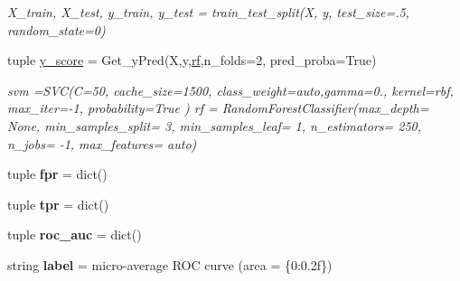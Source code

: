 \begin{DoxyCompactItemize}
\begin{DoxyCompactList}\small\item\em X\+\_\+train, X\+\_\+test, y\+\_\+train, y\+\_\+test = train\+\_\+test\+\_\+split(X, y, test\+\_\+size=.5, random\+\_\+state=0) \end{DoxyCompactList}\item 
tuple \hyperlink{namespacefeat__extract_1_1_sci_kit__plot__roc_a98d01a02754219127aef4d005b5a6792}{y\+\_\+score} = Get\+\_\+y\+Pred(X,y,\hyperlink{namespacefeat__extract_1_1_sci_kit__plot__roc_a8b0b42ffc18823f8984e05932472af40}{rf},n\+\_\+folds=2, pred\+\_\+proba=True)
\begin{DoxyCompactList}\small\item\em svm =S\+V\+C(C=50, cache\+\_\+size=1500, class\+\_\+weight=\textquotesingle{}auto\textquotesingle{},gamma=0., kernel=\textquotesingle{}rbf\textquotesingle{}, max\+\_\+iter=-\/1, probability=True ) rf = Random\+Forest\+Classifier(max\+\_\+depth= None, min\+\_\+samples\+\_\+split= 3, min\+\_\+samples\+\_\+leaf= 1, n\+\_\+estimators= 250, n\+\_\+jobs= -\/1, max\+\_\+features= auto) \end{DoxyCompactList}\item 
\hypertarget{namespacefeat__extract_1_1_sci_kit__plot__roc_aca9bca14b02cc6ce37b7aa2e69c9524f}{}tuple {\bfseries fpr} = dict()\label{namespacefeat__extract_1_1_sci_kit__plot__roc_aca9bca14b02cc6ce37b7aa2e69c9524f}

\item 
\hypertarget{namespacefeat__extract_1_1_sci_kit__plot__roc_a27af3aa05cd8c25711ddbe940ece1850}{}tuple {\bfseries tpr} = dict()\label{namespacefeat__extract_1_1_sci_kit__plot__roc_a27af3aa05cd8c25711ddbe940ece1850}

\item 
\hypertarget{namespacefeat__extract_1_1_sci_kit__plot__roc_a4b6479bcfc1d29c48dc4867845a5ffbc}{}tuple {\bfseries roc\+\_\+auc} = dict()\label{namespacefeat__extract_1_1_sci_kit__plot__roc_a4b6479bcfc1d29c48dc4867845a5ffbc}

\item 
\hypertarget{namespacefeat__extract_1_1_sci_kit__plot__roc_ac510a7d140e9ab72f96b3011f9d67d35}{}string {\bfseries label} = \textquotesingle{}micro-\/average R\+O\+C curve (area = \{0\+:0.\+2f\})\textquotesingle{}\label{namespacefeat__extract_1_1_sci_kit__plot__roc_ac510a7d140e9ab72f96b3011f9d67d35}

\end{DoxyCompactItemize}


